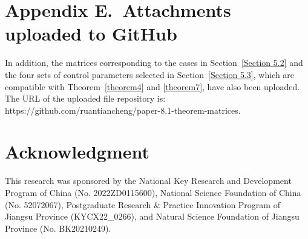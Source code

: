 \documentclass[journal]{IEEEtran}
\begin{document}
\section*{Appendix E.~Attachments uploaded to GitHub}
\label{AppendixE}

In addition, the matrices corresponding to the cases in Section~\ref{Section 5.2} and the four sets of control parameters selected in Section~\ref{Section 5.3}, which are compatible with Theorem~\ref{theorem4} and \ref{theorem7}, have also been uploaded. The URL of the uploaded file repository is:
https://github.com/ruantiancheng/paper-8.1-theorem-matrices.




\section*{Acknowledgment}


This research was sponsored by the National Key Research and Development Program of China (No. 2022ZD0115600),
 National Science Foundation of China (No. 52072067), Postgraduate Research \& Practice Innovation Program of Jiangsu Province (KYCX22\_0266), and Natural Science Foundation of Jiangsu Province (No. BK20210249).


\ifCLASSOPTIONcaptionsoff
 \newpage
\fi





%
%




\end{document}
